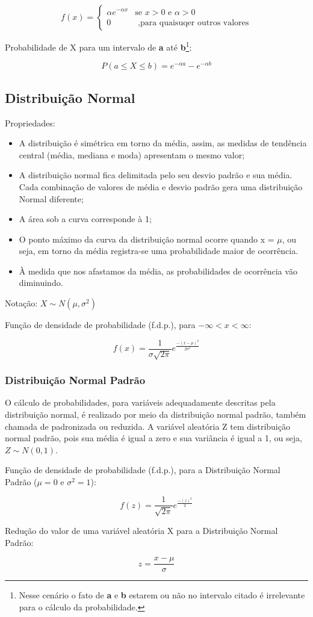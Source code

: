 \[ f(x) =
  \begin{cases}
    \alpha e^{- \alpha x}    & \text{se } x>0 \text{ e } \alpha>0\\
    0 		& \text{ ,para quaisuqer outros valores}
  \end{cases}
\]

Probabilidade de X para um intervalo de \textbf{a} até \textbf{b}\footnote{Nesse cenário o fato de \textbf{a} e \textbf{b} estarem ou não no intervalo citado é irrelevante para o cálculo da probabilidade.}:

\[ P( a \leq X \leq b ) = e^{- \alpha a} - e^{- \alpha b}\]


\subsection{Distribuição Normal}

Propriedades:
\begin{itemize}
	\item A distribuição é simétrica em torno da média, assim, as medidas de tendência central (média, mediana e moda) apresentam o mesmo valor;
 	\item A distribuição normal fica delimitada pelo seu desvio padrão e sua média. Cada combinação de valores de média e desvio padrão gera uma distribuição Normal diferente;
	\item A área sob a curva corresponde à 1;
	\item O ponto máximo da curva da distribuição normal ocorre quando x = \(\mu\), ou seja, em torno da média registra-se uma probabilidade maior de ocorrência. 
	\item À medida que nos afastamos da média, as probabilidades de ocorrência vão diminuindo.
\end{itemize}

Notação: \(X \sim N( \mu , \sigma^2 ) \)

Função de densidade de probabilidade (f.d.p.), para \( - \infty < x < \infty \):


\[ f(x) = \frac{1}{\sigma\sqrt{2\pi}} e^{\frac{-(x-\mu)^2}{2\sigma^2}{}} \]

\subsubsection{Distribuição Normal Padrão}

O cálculo de probabilidades, para variáveis adequadamente descritas pela distribuição normal, é realizado por meio da distribuição normal padrão, também chamada de padronizada ou reduzida. A variável aleatória Z tem distribuição normal padrão, pois sua média é igual a zero e sua variância é igual a 1, ou seja, \( Z \sim N (0, 1) \).

Função de densidade de probabilidade (f.d.p.), para a Distribuição Normal Padrão (\( \mu = 0 \) e \( \sigma^2 = 1 \)):


\[ f(z) = \frac{1}{\sqrt{2\pi}} e^{\frac{-(z)^2}{2}{}} \]

Redução do valor de uma variável aleatória X para a Distribuição Normal Padrão:

\[ z = \frac{x - \mu}{\sigma} \]
